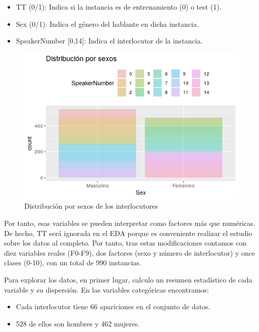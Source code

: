 \begin{itemize}
	\item TT (0/1): Indica si la instancia es de entrenamiento (0) o test (1).
	\item Sex (0/1): Indica el género del hablante en dicha instancia.
	\item SpeakerNumber [0,14]: Indica el interlocutor de la instancia.
\end{itemize}

\begin{figure}[H] %
	\centering
	\includegraphics[scale=0.7]{dist-sexos.png}  %
	\caption{Distribución por sexos de los interlocutores} 
	\label{fig:dist-sex}
\end{figure}

Por tanto, esas variables se pueden interpretar como factores más que numéricas. De hecho, TT será ignorada en el EDA porque es conveniente realizar el estudio sobre los datos al completo. Por tanto, tras estas modificaciones contamos con diez variables reales (F0-F9), dos factores (sexo y número de interlocutor) y once clases (0-10), con un total de 990 instancias. 

Para explorar los datos, en primer lugar, calculo un resumen estadístico de cada variable y su dispersión. En las variables categóricas encontramos:

\begin{itemize}
	\item Cada interlocutor tiene 66 apariciones en el conjunto de datos.
	\item 528 de ellos son hombres y 462 mujeres.
\end{itemize}

